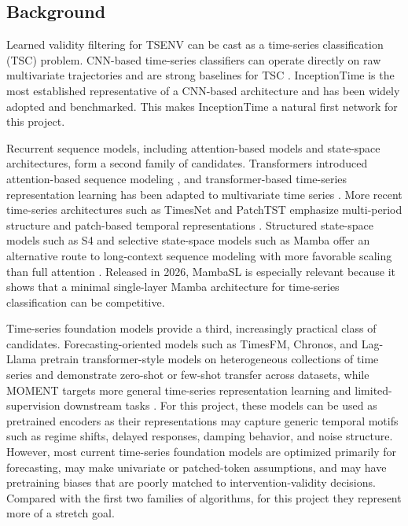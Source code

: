 \documentclass[11pt]{article}
\begin{document}
\subsection*{Background}
Learned validity filtering for TSENV can be cast as a time-series classification (TSC) problem.
CNN-based time-series classifiers can operate directly on raw multivariate trajectories and are strong baselines for TSC \cite{ismailfawaz2019dlreview,wang2017timeseries}. 
InceptionTime is the most established representative of a CNN-based architecture \cite{ismailfawaz2020inceptiontime} and has been widely adopted and benchmarked.
This makes InceptionTime a natural first network for this project.

Recurrent sequence models, including attention-based models and state-space architectures, form a second family of candidates.
Transformers introduced attention-based sequence modeling \cite{vaswani2017attention}, and transformer-based time-series representation learning has been adapted to multivariate time series \cite{zerveas2021transformer}. 
More recent time-series architectures such as TimesNet and PatchTST emphasize multi-period structure and patch-based temporal representations \cite{wu2023timesnet,nie2023patchtst}.
Structured state-space models such as S4 and selective state-space models such as Mamba offer an alternative route to long-context sequence modeling with more favorable scaling than full attention \cite{gu2022s4,gu2023mamba}. 
Released in 2026, MambaSL \cite{jung2026mambasl} is especially relevant because it shows that a minimal single-layer Mamba architecture for time-series classification can be competitive.

Time-series foundation models provide a third, increasingly practical class of candidates.
Forecasting-oriented models such as TimesFM, Chronos, and Lag-Llama pretrain transformer-style models on heterogeneous collections of time series and demonstrate zero-shot or few-shot transfer across datasets, while MOMENT targets more general time-series representation learning and limited-supervision downstream tasks \cite{das2023timesfm,ansari2024chronos,rasul2023lagllama,goswami2024moment}.
For this project, these models can be used as pretrained encoders as their representations may capture generic temporal motifs such as regime shifts, delayed responses, damping behavior, and noise structure.
However, most current time-series foundation models are optimized primarily for forecasting, may make univariate or patched-token assumptions, and may have pretraining biases that are poorly matched to intervention-validity decisions.
Compared with the first two families of algorithms, for this project they represent more of a stretch goal.
\end{document}
